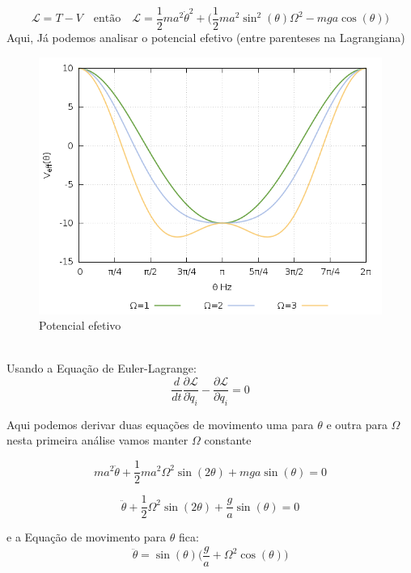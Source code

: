 \documentclass[a4paper,11pt]{exam}
\begin{document}
	\[\mathcal{L} = T - V \quad \text{então} \quad \mathcal{L} = \frac{1}{2}ma^2 \dot\theta^2 + \Big(\frac{1}{2}ma^2 \sin^2(\theta) \Omega^2 - mga\cos{(\theta)\Big)} \]
	Aqui, Já podemos analisar o potencial efetivo (entre parenteses na Lagrangiana)
	\begin{figure}[h]
		\centering
		\includegraphics[scale=0.5]{Gr.png}
		\caption{Potencial efetivo }
	\end{figure}
	\\
	Usando a Equação de Euler-Lagrange:
	\[ \frac{d}{dt} \frac{\partial \mathcal{L}}{\partial \dot q_i}  - \frac{\partial \mathcal{L}}{\partial q_i} = 0 \]
	
	Aqui podemos derivar duas equações de movimento uma para $\theta$ e outra para $\Omega$ nesta primeira análise vamos manter $\Omega$ constante
	
	\[ m a^2 \ddot\theta + \frac{1}{2} ma^2\Omega^2 \sin(2\theta) + mga \sin(\theta) = 0\]
	
	\[ \ddot\theta + \frac{1}{2} \Omega^2 \sin(2\theta) + \frac{g}{a} \sin(\theta) = 0\]
	
	e a Equação de movimento para $\theta$ fica:
	\[ \ddot\theta = \sin(\theta)\Big( \frac{g}{a} + \Omega^2 \cos(\theta) \Big) \]
	
\end{document}
